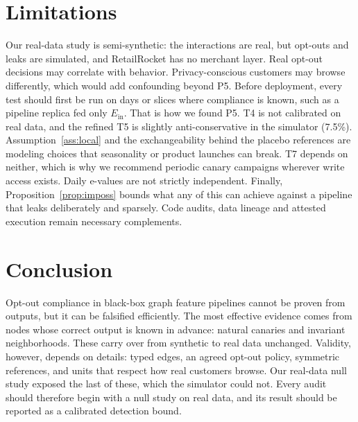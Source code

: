 \documentclass[10pt,twocolumn,letterpaper]{article}
\theoremstyle{definition}
\newcommand{\Ein}{E_{\mathrm{in}}}
\begin{document}
\section{Limitations}\label{sec:limits}
Our real-data study is semi-synthetic: the interactions are real, but opt-outs
and leaks are simulated, and RetailRocket has no merchant layer. Real opt-out
decisions may correlate with behavior. Privacy-conscious customers may browse
differently, which would add confounding beyond P5. Before deployment, every
test should first be run on days or slices where compliance is known, such
as a pipeline replica fed only $\Ein$. That is how we found P5. T4 is not
calibrated on real data, and the refined T5 is slightly anti-conservative in
the simulator (7.5\%). Assumption~\ref{ass:local} and the exchangeability behind
the placebo references are modeling choices that seasonality or product
launches can break. T7 depends on neither, which is why we recommend periodic
canary campaigns wherever write access exists. Daily e-values are not strictly
independent. Finally, Proposition~\ref{prop:imposs} bounds what any of this can
achieve against a pipeline that leaks deliberately and sparsely. Code audits,
data lineage and attested execution remain necessary complements.

\section{Conclusion}
Opt-out compliance in black-box graph feature pipelines cannot be proven
from outputs, but it can be falsified efficiently. The most effective
evidence comes from nodes whose correct output is known in advance: natural
canaries and invariant neighborhoods. These carry over from synthetic to
real data unchanged. Validity, however, depends on details: typed edges, an
agreed opt-out policy, symmetric references, and units that respect how real
customers browse. Our real-data null study exposed the last of these, which
the simulator could not. Every audit should therefore begin with a null study
on real data, and its result should be reported as a calibrated detection
bound.
\end{document}
